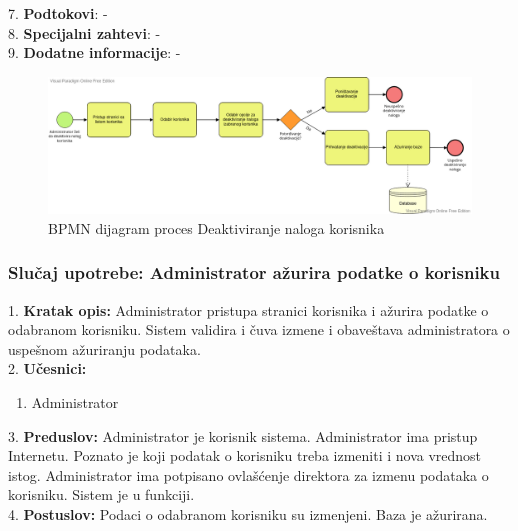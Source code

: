 \documentclass{article}
\begin{document}
7. \textbf{Podtokovi}: - \\

8. \textbf{Specijalni zahtevi}: - \\

9. \textbf{Dodatne informacije}: - \\


\begin{figure} [!ht]
    \begin{center}
        \includegraphics[scale=0.35]{imgs/BPMN_deaktivacija_naloga.png}
    \end{center}
\caption{BPMN dijagram proces Deaktiviranje naloga korisnika}
\end{figure}



\subsubsection{Slučaj upotrebe: Administrator ažurira podatke o korisniku}
1. \textbf{Kratak opis:} Administrator pristupa stranici korisnika i ažurira podatke o odabranom korisniku. Sistem validira i čuva izmene i obaveštava administratora o uspešnom ažuriranju podataka. \\

2. \textbf{Učesnici:}
\begin{enumerate} [label=(\alph*)]
\item Administrator
\end{enumerate} 

3. \textbf{Preduslov:} Administrator je korisnik sistema. Administrator ima pristup Internetu. Poznato je koji podatak o korisniku treba izmeniti i nova vrednost istog. Administrator ima potpisano ovlašćenje direktora za izmenu podataka o korisniku. Sistem je u funkciji. \\

4. \textbf{Postuslov:} Podaci o odabranom korisniku su izmenjeni. Baza je ažurirana. \\
\end{document}
